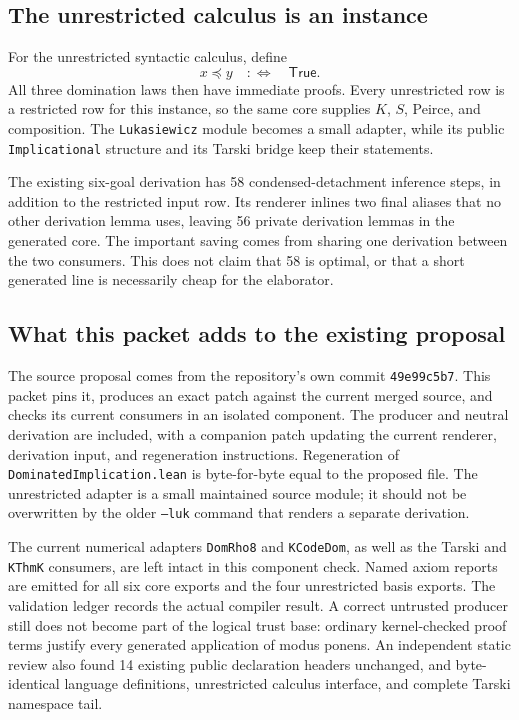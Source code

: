 \documentclass[11pt,letterpaper]{article}
\newcommand{\code}[1]{\texttt{#1}}
\newcommand{\True}{\mathsf{True}}
\begin{document}
\subsection{The unrestricted calculus is an instance}

For the unrestricted syntactic calculus, define
\[
                 x\preceq y\quad:\Longleftrightarrow\quad\True.
\]
All three domination laws then have immediate proofs. Every unrestricted row is a
restricted row for this instance, so the same core supplies $K$, $S$, Peirce, and
composition. The \code{Lukasiewicz} module becomes a small adapter, while its public
\code{Implicational} structure and its Tarski bridge keep their statements.

The existing six-goal derivation has 58 condensed-detachment inference steps, in
addition to the restricted input row. Its renderer inlines
two final aliases that no other derivation lemma uses, leaving 56 private derivation lemmas in the generated
core. The important saving comes from sharing one derivation between the two consumers.
This does not claim that 58 is optimal, or that a short generated line is necessarily
cheap for the elaborator.

\subsection{What this packet adds to the existing proposal}

The source proposal comes from the repository's own commit \code{49e99c5b7}. This
packet pins it, produces an exact patch against the current merged source, and checks
its current consumers in an isolated component. The producer and neutral derivation
are included, with a companion patch updating the current renderer, derivation input,
and regeneration instructions. Regeneration of \code{DominatedImplication.lean} is byte-for-byte equal
to the proposed file. The unrestricted adapter is a small maintained source module;
it should not be overwritten by the older \code{--luk} command that renders a separate
derivation.

The current numerical adapters \code{DomRho8} and \code{KCodeDom}, as well as the
Tarski and \code{KThmK} consumers, are left intact in this component check. Named
axiom reports are emitted for all six core exports and the four unrestricted basis
exports. The validation ledger records the actual compiler result. A correct
untrusted producer still does not become part of the logical trust base: ordinary
kernel-checked proof terms justify every generated application of modus ponens.
An independent static review also found 14 existing public declaration headers
unchanged, and byte-identical language definitions, unrestricted calculus interface,
and complete Tarski namespace tail.
\end{document}
